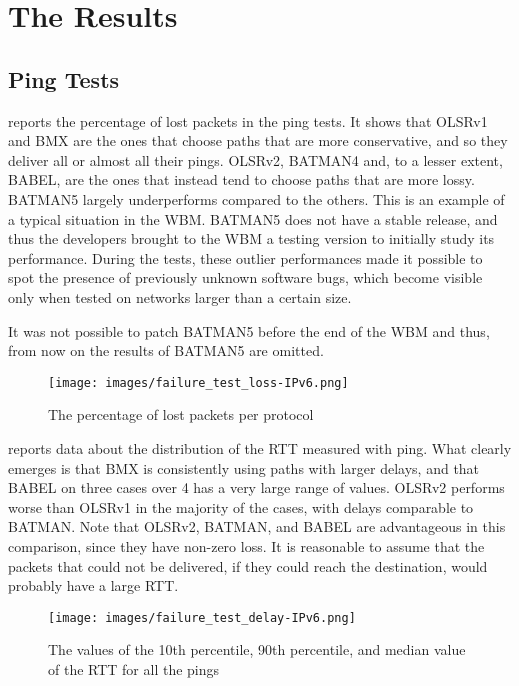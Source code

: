 \documentclass[10pt,onecolumn]{paper}
\begin{document}
\section{The Results}

\subsection{Ping Tests}

 reports the percentage of lost packets in the ping tests. It
shows that OLSRv1 and BMX are the ones that choose paths that are more
conservative, and so they deliver all or almost all their pings. OLSRv2, BATMAN4
and, to a lesser extent, BABEL, are the ones that instead tend to choose paths
that are more lossy. BATMAN5 largely underperforms compared to the others. This
is an example of a typical situation in the WBM. BATMAN5 does not have a stable
release, and thus the developers brought to the WBM a testing version to initially
study its performance. During the tests, these outlier performances made it
possible to spot the presence of previously unknown software bugs, which become
visible only when tested on networks larger than a certain size. 

It was not possible to patch BATMAN5 before the end of the WBM and thus, from
now on the results of BATMAN5 are omitted. 

\begin{figure}
  \centering
  \texttt{[image: images/failure\_test\_loss-IPv6.png]}
  \caption{The percentage of lost packets per protocol}
    \label{fig:pingloss}
\end{figure}

 reports data about the distribution of the RTT measured
with ping. What clearly emerges is that BMX is consistently using paths with
larger delays, and that BABEL on three cases over 4 has a very large range of
values. OLSRv2 performs worse than OLSRv1 in the majority of the cases, with
delays comparable to BATMAN. Note that OLSRv2, BATMAN, and BABEL are advantageous
in this comparison, since they have non-zero loss. It is reasonable to assume
that the packets that could not be delivered, if they could reach the
destination, would probably have a large RTT.

\begin{figure}
  \centering
  \texttt{[image: images/failure\_test\_delay-IPv6.png]}
  \caption{The values of the 10th percentile, 90th percentile, and median value
    of the RTT for all the pings}
  \label{fig:delaydist}
\end{figure}
\end{document}

